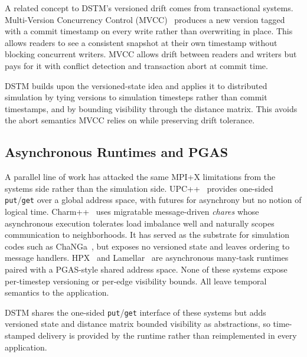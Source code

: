 A related concept to DSTM's versioned drift comes from transactional
systems. 
Multi-Version Concurrency Control
(MVCC)~\cite{bernstein-mvcc} produces a new version tagged with a commit
timestamp on every write rather than overwriting in place. This
allows readers to see a consistent snapshot at their own
timestamp without blocking concurrent writers. MVCC allows drift
between readers and writers but pays for it with conflict
detection and transaction abort at commit time. %

DSTM builds upon the versioned-state idea and applies it to
distributed simulation by tying versions to simulation timesteps
rather than commit timestamps, and by bounding visibility through
the distance matrix. This avoids the abort semantics MVCC
relies on while preserving drift tolerance.

\subsection{Asynchronous Runtimes and PGAS}

A parallel line of work has attacked the same MPI+X limitations
from the systems side rather than the simulation side.
UPC++~\cite{upcxx} provides one-sided \texttt{put}/\texttt{get}
over a global address space, with futures for asynchrony but no
notion of logical time. Charm++~\cite{charmpp, charm14} uses
migratable message-driven \emph{chares} whose asynchronous
execution tolerates load imbalance well and naturally scopes
communication to neighborhoods. It has served as the substrate
for simulation codes such as ChaNGa~\cite{changa}, but exposes
no versioned state and leaves ordering to message handlers.
HPX~\cite{hpx-lci} and Lamellar~\cite{lamellar} are asynchronous
many-task runtimes paired with a PGAS-style shared address space.
None of these systems expose per-timestep versioning or per-edge
visibility bounds. All leave temporal semantics to the
application.

DSTM shares the one-sided \texttt{put}/\texttt{get} interface of
these systems but adds versioned state and distance matrix bounded
visibility as abstractions, so time-stamped delivery
is provided by the runtime rather than reimplemented in every
application.

